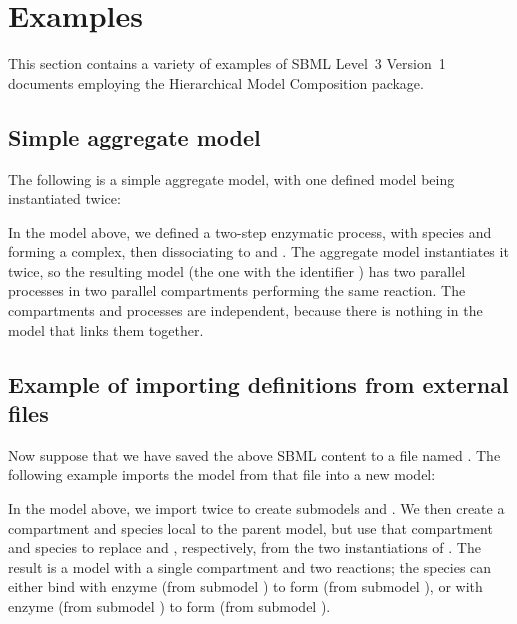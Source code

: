 
\section{Examples}
\label{examples}

This section contains a variety of examples of SBML Level~3 Version~1
documents employing the Hierarchical Model Composition package.

\subsection{Simple aggregate model}

The following is a simple aggregate model, with one defined model being
instantiated twice:


In the model above, we defined a two-step enzymatic process, with
species  and  forming a complex, then dissociating to
 and .  The aggregate model instantiates it twice, so the
resulting model (the one with the identifier ) has two
parallel processes in two parallel compartments performing the same
reaction.  The compartments and processes are independent, because there
is nothing in the model that links them together.


\subsection{Example of importing definitions from external files}

Now suppose that we have saved the above SBML content to a file named
.  The following example imports the model
 from that file into a new model:


In the model above, we import  twice to create submodels 
 and .  We then create a
compartment and species local to the parent model, but use that
compartment and species to replace  and , respectively,
from the two instantiations of .  The result is a model with
a single compartment and two reactions; the species  can either
bind with enzyme  (from submodel ) to form  (from
submodel ), or with enzyme  (from submodel ) to
form  (from submodel ).



